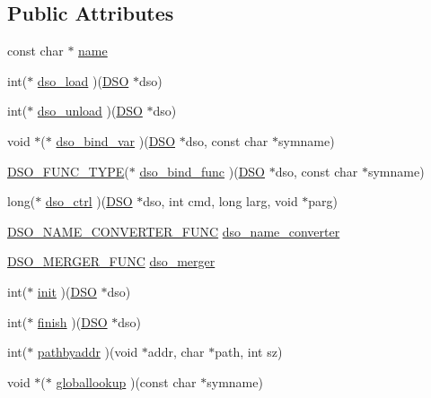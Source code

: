 \subsection*{Public Attributes}
\begin{DoxyCompactItemize}
\item 
const char $\ast$ \hyperlink{structdso__meth__st_aef9c2213572b32054a97a99954505d6e}{name}
\item 
int($\ast$ \hyperlink{structdso__meth__st_ad0931e27df22d21228272993683488b8}{dso\+\_\+load} )(\hyperlink{dso_8h_a4ef2aefd03a4e43c3dd81a159fd27bca}{D\+SO} $\ast$dso)
\item 
int($\ast$ \hyperlink{structdso__meth__st_a330000d54dcc81e708bc60ef31ca9daf}{dso\+\_\+unload} )(\hyperlink{dso_8h_a4ef2aefd03a4e43c3dd81a159fd27bca}{D\+SO} $\ast$dso)
\item 
void $\ast$($\ast$ \hyperlink{structdso__meth__st_a64e053582cae745cef5ff6643b8258cb}{dso\+\_\+bind\+\_\+var} )(\hyperlink{dso_8h_a4ef2aefd03a4e43c3dd81a159fd27bca}{D\+SO} $\ast$dso, const char $\ast$symname)
\item 
\hyperlink{dso_8h_aa8b57c987ab18733dbf4356cc705f0c7}{D\+S\+O\+\_\+\+F\+U\+N\+C\+\_\+\+T\+Y\+PE}($\ast$ \hyperlink{structdso__meth__st_a6a179a5a759e8d6837055f217848e3db}{dso\+\_\+bind\+\_\+func} )(\hyperlink{dso_8h_a4ef2aefd03a4e43c3dd81a159fd27bca}{D\+SO} $\ast$dso, const char $\ast$symname)
\item 
long($\ast$ \hyperlink{structdso__meth__st_abc9ee5fe4894fa7bd80d37e1d20393ec}{dso\+\_\+ctrl} )(\hyperlink{dso_8h_a4ef2aefd03a4e43c3dd81a159fd27bca}{D\+SO} $\ast$dso, int cmd, long larg, void $\ast$parg)
\item 
\hyperlink{dso_8h_a2053feef6f1d37b3fc3f96f6afb1eabf}{D\+S\+O\+\_\+\+N\+A\+M\+E\+\_\+\+C\+O\+N\+V\+E\+R\+T\+E\+R\+\_\+\+F\+U\+NC} \hyperlink{structdso__meth__st_a02abdcfb6f66b31d697d4bdc4ec647ba}{dso\+\_\+name\+\_\+converter}
\item 
\hyperlink{dso_8h_aeb778a1546fa4335ba36dabe92103211}{D\+S\+O\+\_\+\+M\+E\+R\+G\+E\+R\+\_\+\+F\+U\+NC} \hyperlink{structdso__meth__st_a69ab12d20b8622ad9ac892e9feb29a10}{dso\+\_\+merger}
\item 
int($\ast$ \hyperlink{structdso__meth__st_af88ab1073bac7849a6b23a0cb7df4872}{init} )(\hyperlink{dso_8h_a4ef2aefd03a4e43c3dd81a159fd27bca}{D\+SO} $\ast$dso)
\item 
int($\ast$ \hyperlink{structdso__meth__st_a936ec4fc5bf24889189556a37a3c83b7}{finish} )(\hyperlink{dso_8h_a4ef2aefd03a4e43c3dd81a159fd27bca}{D\+SO} $\ast$dso)
\item 
int($\ast$ \hyperlink{structdso__meth__st_ae05dbf002bd9bf1d78d1ca833f225e4b}{pathbyaddr} )(void $\ast$addr, char $\ast$path, int sz)
\item 
void $\ast$($\ast$ \hyperlink{structdso__meth__st_a3aa2a99cee5689fdd4800498f4d791b6}{globallookup} )(const char $\ast$symname)
\end{DoxyCompactItemize}


